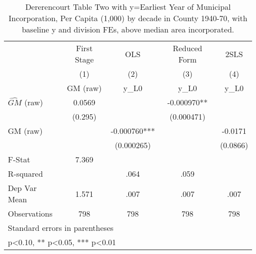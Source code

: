 \begin{table}[htbp]\centering
\def\sym#1{\ifmmode^{#1}\else\(^{#1}\)\fi}
\caption{Dererencourt Table Two with y=Earliest Year of Municipal Incorporation, Per Capita (1,000) by decade in County 1940-70, with baseline y and division FEs, above median area incorporated.}
\begin{tabular}{l*{4}{c}}
\toprule
                    & First Stage   &         OLS   &Reduced Form   &        2SLS   \\
                    &\multicolumn{1}{c}{(1)}&\multicolumn{1}{c}{(2)}&\multicolumn{1}{c}{(3)}&\multicolumn{1}{c}{(4)}\\
                    &\multicolumn{1}{c}{GM  (raw)}&\multicolumn{1}{c}{y\_L0}&\multicolumn{1}{c}{y\_L0}&\multicolumn{1}{c}{y\_L0}\\
\midrule
$\hat{GM}$ (raw)    &      0.0569   &               &   -0.000970** &               \\
                    &     (0.295)   &               &  (0.000471)   &               \\
\addlinespace
GM  (raw)           &               &   -0.000760***&               &     -0.0171   \\
                    &               &  (0.000265)   &               &    (0.0866)   \\
\midrule
F-Stat              &       7.369   &               &               &               \\
R-squared           &               &        .064   &        .059   &               \\
Dep Var Mean        &       1.571   &        .007   &        .007   &        .007   \\
Observations        &         798   &         798   &         798   &         798   \\
\bottomrule
\multicolumn{5}{l}{\footnotesize Standard errors in parentheses}\\
\multicolumn{5}{l}{\footnotesize * p<0.10, ** p<0.05, *** p<0.01}\\
\end{tabular}
\end{table}
